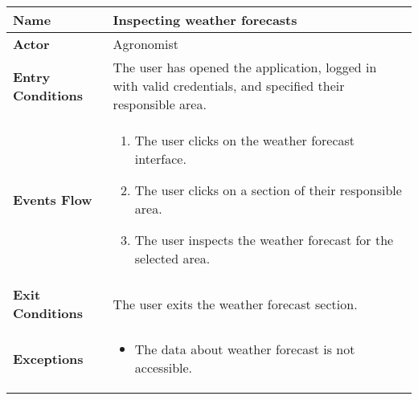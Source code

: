 \begin{center}
\renewcommand{\arraystretch}{1.25}
\begin{tabular}{|l|>{\raggedright\arraybackslash}m{12cm}|}
    \hline
    \textbf{Name} & Inspecting weather forecasts\\
    \hline
   	\textbf{Actor} & Agronomist\\
    \hline
    \textbf{Entry Conditions} & The user has opened the application, logged in with valid credentials, and specified their responsible area.\\    
    \hline
    \textbf{Events Flow} & 
    	\begin{enumerate}
            \item The user clicks on the weather forecast interface.
            \item The user clicks on a section of their responsible area.
            \item The user inspects the weather forecast for the selected area.
       \end{enumerate}\\
    \hline
    \textbf{Exit Conditions} & The user exits the weather forecast section.\\
    \hline
    \textbf{Exceptions} & 
    	\begin{itemize}
	    	\item The data about weather forecast is not accessible.
    	\end{itemize}\\
    \hline 
\end{tabular}
\end{center}

